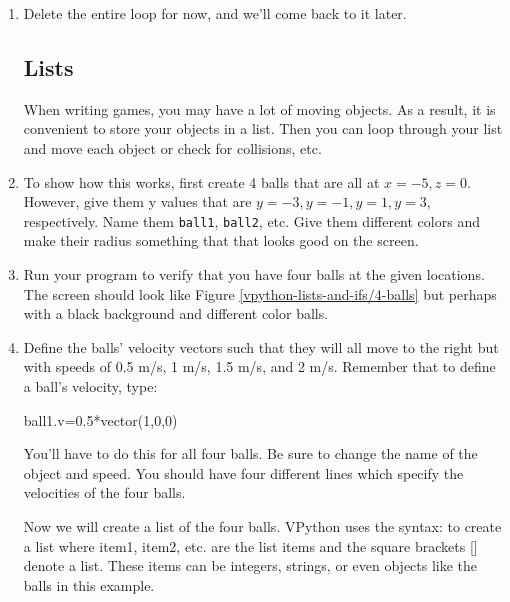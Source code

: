 \begin{enumerate}

\item Delete the entire  loop for now, and we'll come back to it later.

\subsection*{Lists}

When writing games, you may have a lot of moving objects. As a result, it is convenient to store your objects in a list. Then you can loop through your list and move each object or check for collisions, etc.

\item To show how this works, first create 4 balls that are all at $x=-5, z=0$. However, give them y values that are $y=-3, y=-1, y=1, y=3$, respectively. Name them \texttt{ball1}, \texttt{ball2}, etc. Give them different colors and make their radius something that that looks good on the screen. 

\item Run your program to verify that you have four balls at the given locations. The screen should look like Figure \ref{vpython-lists-and-ifs/4-balls} but perhaps with a black background and different color balls.


\item Define the balls' velocity vectors such that they will all move to the right but with speeds of 0.5 m/s, 1 m/s, 1.5 m/s, and 2 m/s. Remember that to define a ball's velocity, type:

\begin{myvpython}
ball1.v=0.5*vector(1,0,0)
\end{myvpython}

You'll have to do this for all four balls. Be sure to change the name of the object and speed. You should have four different lines which specify the velocities of the four balls.

Now we will create a list of the four balls. VPython uses the syntax:  to create a list where item1, item2, etc. are the list items and the square brackets [] denote a list. These items can be integers, strings, or even objects like the balls in this example.


\end{enumerate}
